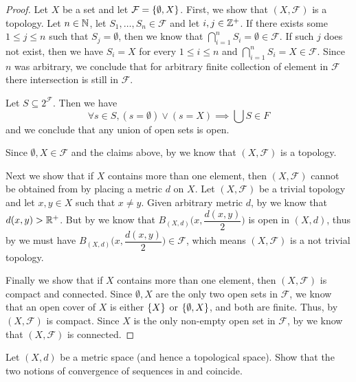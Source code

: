\begin{proof}
  Let \(X\) be a set and let \(\mathcal{F} = \left\lbrace\emptyset, X\right\rbrace\).
  First, we show that \((X, \mathcal{F})\) is a topology.
  Let \(n \in \mathbb{N}\), let \(S_1, \dots, S_n \in \mathcal{F}\) and let \(i, j \in \mathbb{Z}^+\).
  If there exists some \(1 \leq j \leq n\) such that \(S_j = \emptyset\), then we know that \(\bigcap_{i = 1}^n S_i = \emptyset \in \mathcal{F}\).
  If such \(j\) does not exist, then we have \(S_i = X\) for every \(1 \leq i \leq n\) and \(\bigcap_{i = 1}^n S_i = X \in \mathcal{F}\).
  Since \(n\) was arbitrary, we conclude that for arbitrary finite collection of element in \(\mathcal{F}\) there intersection is still in \(\mathcal{F}\).

  Let \(S \subseteq 2^{\mathcal{F}}\).
  Then we have
  \[
    \forall s \in S, (s = \emptyset) \lor (s = X) \implies \bigcup S \in F
  \]
  and we conclude that any union of open sets is open.

  Since \(\emptyset, X \in \mathcal{F}\) and the claims above, by  we know that \((X, \mathcal{F})\) is a topology.

  Next we show that if \(X\) contains more than one element, then \((X, \mathcal{F})\) cannot be obtained from by placing a metric \(d\) on \(X\).
  Let \((X, \mathcal{F})\) be a trivial topology and let \(x, y \in X\) such that \(x \neq y\).
  Given arbitrary metric \(d\), by  we know that \(d(x, y) > \mathbb{R}^+\).
  But by  we know that \(B_{(X, d)}\big(x, \dfrac{d(x, y)}{2}\big)\) is open in \((X, d)\), thus by  we must have \(B_{(X, d)}\big(x, \dfrac{d(x, y)}{2}\big) \in \mathcal{F}\), which means \((X, \mathcal{F})\) is a not trivial topology.

  Finally we show that if \(X\) contains more than one element, then \((X, \mathcal{F})\) is compact and connected.
  Since \(\emptyset, X\) are the only two open sets in \(\mathcal{F}\), we know that an open cover of \(X\) is either \(\left\lbrace X\right\rbrace\) or \(\left\lbrace\emptyset, X\right\rbrace\), and both are finite.
  Thus, by  \((X, \mathcal{F})\) is compact.
  Since \(X\) is the only non-empty open set in \(\mathcal{F}\), by  we know that \((X, \mathcal{F})\) is connected.
\end{proof}

\begin{ex}\label{ii:ex:2.5.2}
  Let \((X, d)\) be a metric space
  (and hence a topological space).
  Show that the two notions of convergence of sequences in  and  coincide.
\end{ex}

